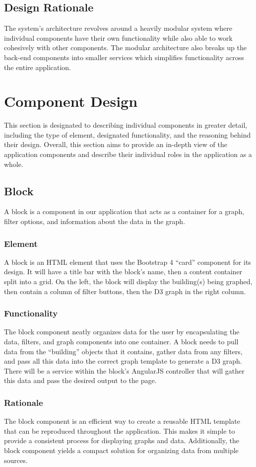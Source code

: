 \documentclass[journal,10pt,onecolumn,compsoc]{IEEEtran}
\begin{document}
    \subsection{Design Rationale}
    The system's architecture revolves around a heavily modular system where individual components have their own functionality while also able to work cohesively with other components. The modular architecture also breaks up the back-end components into smaller services which simplifies functionality across the entire application.
    \section{Component Design}
    This section is designated to describing individual components in greater detail, including the type of element, designated functionality, and the reasoning behind their design. Overall, this section aims to provide an in-depth view of the application components and describe their individual roles in the application as a whole.
    \subsection{Block}
    A block is a component in our application that acts as a container for a graph, filter options, and  information about the data in the graph.
    \subsubsection{Element} 
    A block is an HTML element that uses the Bootstrap 4 ``card'' component for its design. It will have a title bar with the block's name, then a content container split into a grid. On the left, the block will display the building(s) being graphed, then contain a column of filter buttons, then the D3 graph in the right column. 
    \subsubsection{Functionality}
    The block component neatly organizes data for the user by encapsulating the data, filters, and graph components into one container. A block needs to pull data from the ``building'' objects that it contains, gather data from any filters, and pass all this data into the correct graph template to generate a D3 graph. There will be a service within the block's AngularJS controller that will gather this data and pass the desired output to the page.
    \subsubsection{Rationale} 
    The block component is an efficient way to create a reusable HTML template that can be reproduced throughout the application. This makes it simple to provide a consistent process for displaying graphs and data. Additionally, the block component yields a compact solution for organizing data from multiple sources. 
    
\end{document}
